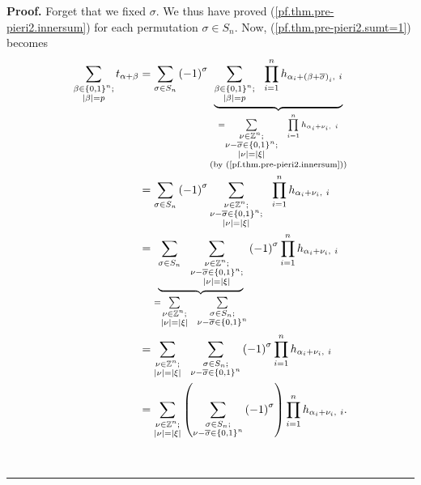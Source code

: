 \documentclass[numbers=enddot,12pt,final,onecolumn,notitlepage,english]{scrartcl}%
\theoremstyle{definition}
\newenvironment{proof}[1][Proof]{\noindent\textbf{#1.} }{\ \rule{0.5em}{0.5em}}
\let\sumnonlimits\sum
\let\prodnonlimits\prod
\renewcommand{\sum}{\sumnonlimits\limits}
\renewcommand{\prod}{\prodnonlimits\limits}
\newenvironment{verlong}{}{}
\begin{document}
\begin{verlong}
\begin{proof}
Forget that we fixed $\sigma$. We thus have proved
(\ref{pf.thm.pre-pieri2.innersum}) for each permutation $\sigma\in S_{n}$.
Now, (\ref{pf.thm.pre-pieri2.sumt=1}) becomes%
\begin{align}
\sum_{\substack{\beta\in\left\{  0,1\right\}  ^{n};\\\left\vert \beta
\right\vert =p}}t_{\alpha+\beta}  &  =\sum_{\sigma\in S_{n}}\left(  -1\right)
^{\sigma}\underbrace{\sum_{\substack{\beta\in\left\{  0,1\right\}
^{n};\\\left\vert \beta\right\vert =p}}\ \ \prod_{i=1}^{n}h_{\alpha
_{i}+\left(  \beta+\overline{\sigma}\right)  _{i},\ i}}_{\substack{=\sum
_{\substack{\nu\in\mathbb{Z}^{n};\\\nu-\overline{\sigma}\in\left\{
0,1\right\}  ^{n};\\\left\vert \nu\right\vert =\left\vert \xi\right\vert
}}\ \ \prod_{i=1}^{n}h_{\alpha_{i}+\nu_{i},\ i}\\\text{(by
(\ref{pf.thm.pre-pieri2.innersum}))}}}\nonumber\\
&  =\sum_{\sigma\in S_{n}}\left(  -1\right)  ^{\sigma}\sum_{\substack{\nu
\in\mathbb{Z}^{n};\\\nu-\overline{\sigma}\in\left\{  0,1\right\}
^{n};\\\left\vert \nu\right\vert =\left\vert \xi\right\vert }}\ \ \prod
_{i=1}^{n}h_{\alpha_{i}+\nu_{i},\ i}\nonumber\\
&  =\underbrace{\sum_{\sigma\in S_{n}}\ \ \sum_{\substack{\nu\in\mathbb{Z}%
^{n};\\\nu-\overline{\sigma}\in\left\{  0,1\right\}  ^{n};\\\left\vert
\nu\right\vert =\left\vert \xi\right\vert }}}_{=\sum_{\substack{\nu
\in\mathbb{Z}^{n};\\\left\vert \nu\right\vert =\left\vert \xi\right\vert
}}\ \ \sum_{\substack{\sigma\in S_{n};\\\nu-\overline{\sigma}\in\left\{
0,1\right\}  ^{n}}}}\left(  -1\right)  ^{\sigma}\prod_{i=1}^{n}h_{\alpha
_{i}+\nu_{i},\ i}\nonumber\\
&  =\sum_{\substack{\nu\in\mathbb{Z}^{n};\\\left\vert \nu\right\vert
=\left\vert \xi\right\vert }}\ \ \sum_{\substack{\sigma\in S_{n}%
;\\\nu-\overline{\sigma}\in\left\{  0,1\right\}  ^{n}}}\left(  -1\right)
^{\sigma}\prod_{i=1}^{n}h_{\alpha_{i}+\nu_{i},\ i}\nonumber\\
&  =\sum_{\substack{\nu\in\mathbb{Z}^{n};\\\left\vert \nu\right\vert
=\left\vert \xi\right\vert }}\left(  \sum_{\substack{\sigma\in S_{n}%
;\\\nu-\overline{\sigma}\in\left\{  0,1\right\}  ^{n}}}\left(  -1\right)
^{\sigma}\right)  \prod_{i=1}^{n}h_{\alpha_{i}+\nu_{i},\ i}.
\label{pf.thm.pre-pieri2.2}%
\end{align}



\end{proof}
\end{verlong}
\end{document}
